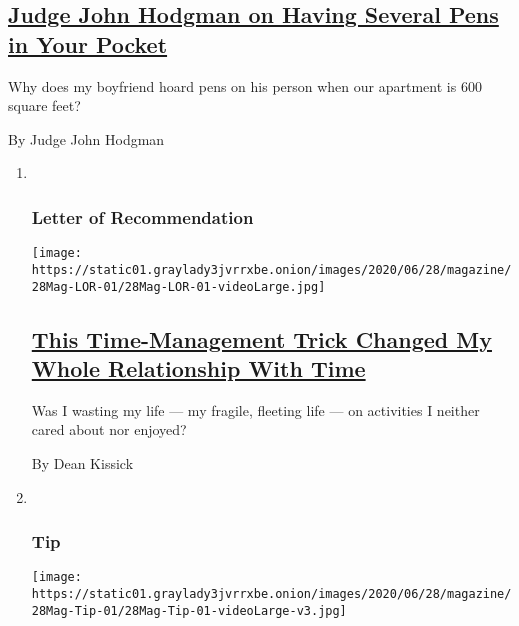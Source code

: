 \begin{enumerate}
  \hypertarget{judge-john-hodgman-on-having-several-pens-in-your-pocket}{%
  \subsection{\texorpdfstring{\href{/2020/06/25/magazine/judge-john-hodgman-on-having-several-pens-in-your-pocket.html}{Judge
  John Hodgman on Having Several Pens in Your
  Pocket}}{Judge John Hodgman on Having Several Pens in Your Pocket}}\label{judge-john-hodgman-on-having-several-pens-in-your-pocket}}

  Why does my boyfriend hoard pens on his person when our apartment is
  600 square feet?

  By Judge John Hodgman
\end{enumerate}

\begin{enumerate}
\def\labelenumi{\arabic{enumi}.}
\item ~
  \hypertarget{letter-of-recommendation}{%
  \subsubsection{Letter of
  Recommendation}\label{letter-of-recommendation}}

  \texttt{[image: https://static01.graylady3jvrrxbe.onion/images/2020/06/28/magazine/28Mag-LOR-01/28Mag-LOR-01-videoLarge.jpg]}

  \hypertarget{this-time-management-trick-changed-my-whole-relationship-with-time}{%
  \subsection{\texorpdfstring{\href{/2020/06/23/magazine/pomodoro-technique.html}{This
  Time-Management Trick Changed My Whole Relationship With
  Time}}{This Time-Management Trick Changed My Whole Relationship With Time}}\label{this-time-management-trick-changed-my-whole-relationship-with-time}}

  Was I wasting my life --- my fragile, fleeting life --- on activities
  I neither cared about nor enjoyed?

  By Dean Kissick
\item ~
  \hypertarget{tip}{%
  \subsubsection{Tip}\label{tip}}

  \texttt{[image: https://static01.graylady3jvrrxbe.onion/images/2020/06/28/magazine/28Mag-Tip-01/28Mag-Tip-01-videoLarge-v3.jpg]}


\end{enumerate}
